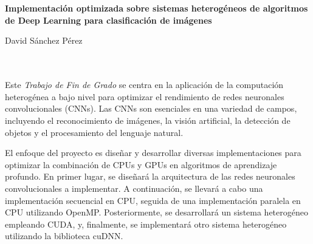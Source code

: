 \chapter*{}






\cleardoublepage
\thispagestyle{empty}

\begin{center}
{\large\bfseries Implementación optimizada sobre sistemas heterogéneos de algoritmos de Deep Learning para clasificación de imágenes}\\
\end{center}
\begin{center}
David Sánchez Pérez\\
\end{center}

\\

\vspace{0.7cm}
\\

Este \textit{Trabajo de Fin de Grado} se centra en la aplicación de la computación heterogénea a bajo nivel para optimizar el rendimiento de redes neuronales convolucionales (CNNs). Las CNNs son esenciales en una variedad de campos, incluyendo el reconocimiento de imágenes, la visión artificial, la detección de objetos y el procesamiento del lenguaje natural. 

El enfoque del proyecto es diseñar y desarrollar diversas implementaciones para optimizar la combinación de CPUs y GPUs en algoritmos de aprendizaje profundo. En primer lugar, se diseñará la arquitectura de las redes neuronales convolucionales a implementar. A continuación, se llevará a cabo una implementación secuencial en CPU, seguida de una implementación paralela en CPU utilizando OpenMP. Posteriormente, se desarrollará un sistema heterogéneo empleando CUDA, y, finalmente, se implementará otro sistema heterogéneo utilizando la biblioteca cuDNN.

